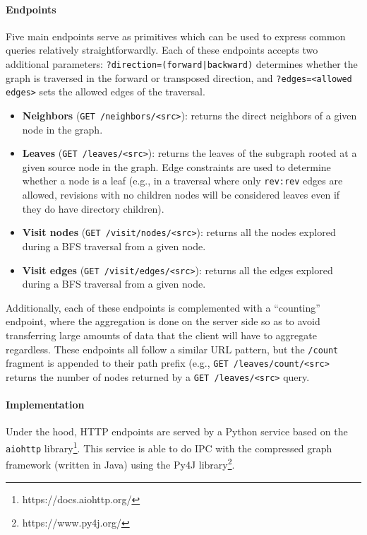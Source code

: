\paragraph*{Endpoints}

Five main endpoints serve as primitives which can be used to express common
queries relatively straightforwardly. Each of these endpoints accepts two
additional parameters: \texttt{?direction=(forward|backward)} determines whether
the graph is traversed in the forward or transposed direction, and
\texttt{?edges=<allowed edges>} sets the allowed edges of the traversal.

\begin{itemize}
    \item \textbf{Neighbors} (\texttt{GET /neighbors/<src>}): returns the
        direct neighbors of a given node in the graph.
    \item \textbf{Leaves} (\texttt{GET /leaves/<src>}): returns the
        leaves of the subgraph rooted at a given source node in the graph. Edge
        constraints are used to determine whether a node is a leaf (e.g., in a
        traversal where only \texttt{rev:rev} edges are allowed, revisions with
        no children nodes will be considered leaves even if they do have
        directory children).
    \item \textbf{Visit nodes} (\texttt{GET /visit/nodes/<src>}): returns all
        the nodes explored during a \gls{BFS} traversal from a given node.
    \item \textbf{Visit edges} (\texttt{GET /visit/edges/<src>}): returns all
        the edges explored during a \gls{BFS} traversal from a given node.
\end{itemize}

Additionally, each of these endpoints is complemented with a ``counting''
endpoint, where the aggregation is done on the server side so as to avoid
transferring large amounts of data that the client will have to aggregate
regardless. These endpoints all follow a similar URL pattern, but the
\texttt{/count} fragment is appended to their path prefix (e.g., \texttt{GET
/leaves/count/<src>} returns the number of nodes returned by a \texttt{GET
/leaves/<src>} query.

\paragraph*{Implementation}

Under the hood, HTTP endpoints are served by a Python service based
on the \texttt{aiohttp} library\footnote{https://docs.aiohttp.org/}. This
service is able to do \gls{IPC} with the compressed graph framework (written in
Java) using the Py4J library\footnote{https://www.py4j.org/}.

